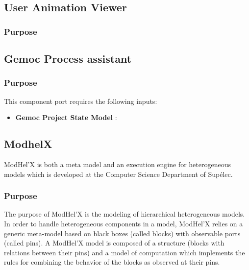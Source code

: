 \documentclass{gemoc} %
\begin{document}
\subsection{User Animation Viewer}


\subsubsection{Purpose}



\subsection{Gemoc Process assistant}


\subsubsection{Purpose}

This component port requires the following inputs:
\begin{itemize}
  \item \textbf{Gemoc Project State Model} :
\end{itemize}


\subsection{ModhelX}
ModHel'X is both a meta model and an execution engine for heterogeneous models which is developed at the Computer Science Department of Supélec.

\subsubsection{Purpose}
The purpose of ModHel'X is the modeling of hierarchical heterogeneous models. In order to handle heterogeneous components in a model, ModHel'X relies on a generic meta-model based on black boxes (called blocks) with observable ports (called pins). A ModHel'X model is composed of a structure (blocks with relations between their pins) and a model of computation which implements the rules for combining the behavior of the blocks as observed at their pins.
\end{document}
